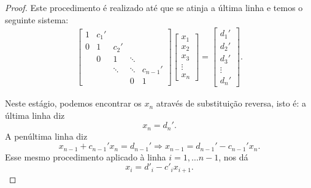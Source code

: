 \begin{proof}
Este procedimento é realizado até que se atinja a última linha e temos o seguinte sistema:
\begin{eqnarray*} \begin{bmatrix}
   {1} & {c_1'} & {   } & {   } & {   } \\
   {0} & {1} & {c_2'} & {   } & {   } \\
   {   } & { 0 } & {1} & \ddots & {   } \\
   {   } & {   } & \ddots & \ddots & {c_{n-1}'}\\
   {   } & {   } & {   } & { 0 } & { 1 }
\end{bmatrix}
\begin{bmatrix}
   {x_1 }  \\
   {x_2 }  \\
   {x_3 }  \\
   \vdots   \\
   {x_n }
\end{bmatrix}
=
\begin{bmatrix}
   {d_1' }  \\
   {d_2' }  \\
   {d_3'}  \\
   \vdots   \\
   {d_n' }
\end{bmatrix}.
\end{eqnarray*}

Neste estágio, podemos encontrar os $x_n$ através de substituição reversa, isto é: a última linha diz $$x_n=d_n'.$$
A penúltima linha diz $$x_{n-1}+c_{n-1}'x_n=d_{n-1}' \Longrightarrow x_{n-1}=d_{n-1}'-c_{n-1}'x_{n}.$$
Esse mesmo procedimento aplicado à linha $i=1,\ldots n-1$, nos dá $$x_i = d'_i - c'_i x_{i + 1}. $$
\end{proof}

